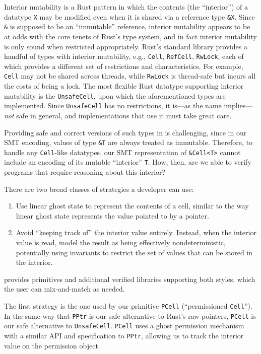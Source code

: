 Interior mutability is a Rust pattern in which the contents (the ``interior'') of a datatype \verb`X` may be modified even when it is shared via a reference type \verb`&X`.
Since \verb`&` is supposed to be an ``immutable'' reference, interior mutability appears to be at odds with the core tenets of Rust's type system, and in fact
interior mutability is only sound when restricted appropriately.
Rust's standard library provides a handful of types with interior mutability, e.g., \verb`Cell`, \verb`RefCell`, \verb`RwLock`, each of which provides a different set of restrictions
and characteristics. For example, \verb`Cell` may not be shared across threads, while \verb`RwLock` is thread-safe but incurs all the costs of being a lock.
The most flexible Rust datatype supporting interior mutability is the \verb`UnsafeCell`, upon which the aforementioned types are implemented. %
Since \verb`UnsafeCell` has no restrictions, it is---as the name implies---\emph{not} safe in general, and implementations that use it must take great care.

Providing safe and correct versions of such types in \verus is challenging, 
since in our SMT encoding, values of type \verb`&T` are always treated as immutable.
Therefore, to handle any \verb`Cell`-like datatypes, our SMT representation of \verb`&Cell<T>` cannot include an encoding of its mutable ``interior'' \verb`T`.
How, then, are we able to verify programs that require reasoning about this interior?

There are two broad classes of strategies a \verus developer can use:
\begin{enumerate}
  \item Use linear ghost state to represent the contents of a cell, similar to the way linear ghost state represents the value pointed to by a pointer.
  \item Avoid ``keeping track of'' the interior value entirely. Instead, when the interior value is read, model the result as being effectively nondeterministic,
      potentially using invariants to restrict the set of values that can be stored in the interior.
\end{enumerate}
\verus provides primitives and additional verified libraries supporting both styles, which the user can mix-and-match as needed.

The first strategy is the one used by our primitive \verb`PCell` (``permissioned \verb`Cell`'').
In the same way that \verb`PPtr` is our safe alternative to Rust's raw pointers,
\verb`PCell` is our safe alternative to \verb`UnsafeCell`.
\verb`PCell` uses a ghost permission mechanism with a similar API and specification to \verb`PPtr`, allowing us to track the interior value on the permission object.

